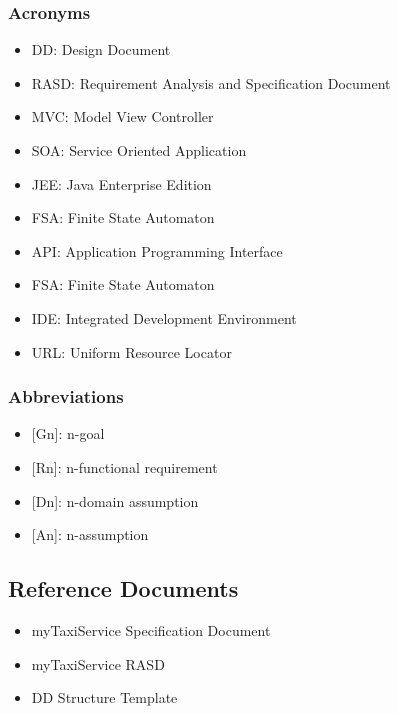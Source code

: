 \subsubsection{Acronyms}
\begin{itemize}
	\item DD: Design Document
	\item RASD: Requirement Analysis and Specification Document
	\item MVC: Model View Controller
	\item SOA: Service Oriented Application
	\item JEE: Java Enterprise Edition
	\item FSA: Finite State Automaton
	\item API: Application Programming Interface
	\item FSA: Finite State Automaton
	\item IDE: Integrated Development Environment
	\item URL: Uniform Resource Locator
\end{itemize}
\subsubsection{Abbreviations}
\begin{itemize}
\item {[}Gn{]}: n-goal 
\item {[}Rn{]}: n-functional requirement
\item {[}Dn{]}: n-domain assumption
\item {[}An{]}: n-assumption
\end{itemize}
\subsection{Reference Documents}
\begin{itemize}
	\item myTaxiService Specification Document
	\item myTaxiService RASD
	\item DD Structure Template
\end{itemize}
